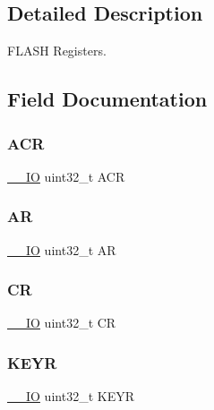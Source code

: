 \subsection{Detailed Description}
F\+L\+A\+SH Registers. 

\subsection{Field Documentation}
\mbox{\label{struct_f_l_a_s_h___type_def_a9cb55206b29a8c16354747c556ab8bea}} 
\subsubsection{\texorpdfstring{ACR}{ACR}}
{\footnotesize\ttfamily \mbox{\hyperlink{core__sc300_8h_aec43007d9998a0a0e01faede4133d6be}{\+\_\+\+\_\+\+IO}} uint32\+\_\+t A\+CR}

\mbox{\label{struct_f_l_a_s_h___type_def_a2ac50357d1ebac2949d27bfc4855e6a4}} 
\subsubsection{\texorpdfstring{AR}{AR}}
{\footnotesize\ttfamily \mbox{\hyperlink{core__sc300_8h_aec43007d9998a0a0e01faede4133d6be}{\+\_\+\+\_\+\+IO}} uint32\+\_\+t AR}

\mbox{\label{struct_f_l_a_s_h___type_def_ab40c89c59391aaa9d9a8ec011dd0907a}} 
\subsubsection{\texorpdfstring{CR}{CR}}
{\footnotesize\ttfamily \mbox{\hyperlink{core__sc300_8h_aec43007d9998a0a0e01faede4133d6be}{\+\_\+\+\_\+\+IO}} uint32\+\_\+t CR}

\mbox{\label{struct_f_l_a_s_h___type_def_a84c491be6c66b1d5b6a2efd0740b3d0c}} 
\subsubsection{\texorpdfstring{KEYR}{KEYR}}
{\footnotesize\ttfamily \mbox{\hyperlink{core__sc300_8h_aec43007d9998a0a0e01faede4133d6be}{\+\_\+\+\_\+\+IO}} uint32\+\_\+t K\+E\+YR}

